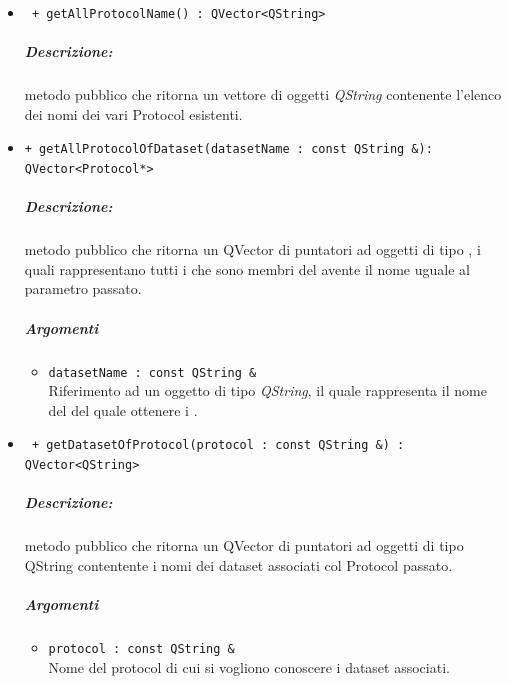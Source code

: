\begin{itemize}
	\item \color{blue}\verb! + getAllProtocolName() : QVector<QString>!\\
	\color{black}
	\subparagraph{Descrizione:} metodo pubblico che ritorna un vettore di oggetti \textsl{QString} contenente l'elenco dei nomi dei vari Protocol\g{} esistenti.
	
	\item \color{blue}\verb!+ getAllProtocolOfDataset(datasetName : const QString &): QVector<Protocol*>!
	\color{black} 
	\subparagraph{Descrizione:} metodo pubblico che ritorna un QVector di puntatori ad oggetti di tipo \protocol{}, i quali rappresentano tutti i \protocol{} che sono membri del \dataset{} avente il nome uguale al parametro passato.
	\subparagraph{Argomenti}
	\begin{itemize}
		\item\color{RoyalPurple} \verb!datasetName : const QString &! \\ 
		\color{black}Riferimento ad un oggetto di tipo \textsl{QString}, il quale rappresenta il nome del \dataset{} del quale ottenere i \protocol{}.
	\end{itemize}
	
	\item \color{blue}\verb! + getDatasetOfProtocol(protocol : const QString &) : QVector<QString>!
	\color{black}
	\subparagraph{Descrizione:} metodo pubblico che ritorna un QVector di puntatori ad oggetti di tipo QString contentente i nomi dei dataset associati col Protocol\g{} passato.
	\subparagraph{Argomenti}
		\begin{itemize}
			\item \color{RoyalPurple}\verb!protocol : const QString &!\\
			\color{black}Nome del protocol\g{} di cui si vogliono conoscere i dataset\g{} associati.
		\end{itemize}

\end{itemize}














\pagebreak

